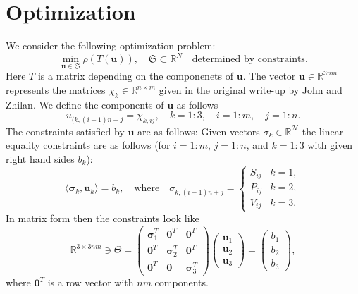 \documentclass[12pt]{amsart}
\theoremstyle{definition}
\begin{document}
\section{Optimization}
We consider the following optimization problem:
\begin{equation}
  \min_{\bm{u}\in \mathfrak{S}} \rho(T(\bm{u})),\quad \mathfrak{S}\subset \mathds{R}^{N} \quad\mbox{determined by constraints}.
\end{equation}
Here $T$ is a matrix depending on the componenets of $\bm{u}$. 
The vector $\bm{u}\in \mathds{R}^{3nm}$ represents the matrices 
$\chi_{k}\in \mathds{R}^{n\times m}$ given in the original write-up by John and Zhilan. We define the components of $\bm u$ as follows
\begin{equation}
  u_{(k,(i-1)n+j}=\chi_{k,ij}, \quad k=1:3, \quad i=1:m,\quad j=1:n.
\end{equation}
The constraints satisfied by $\bm u$ are as follows: Given vectors $\sigma_k\in \mathds{R}^{\mathcal{N}}$ the linear equality constraints are as follows (for $i=1:m$, $j=1:n$, and  $k=1:3$ with given right hand sides $b_k$):
\begin{equation}
\langle \bm{\sigma}_k,\bm{u}_k\rangle = b_k,\quad\mbox{where}\quad
\sigma_{k,(i-1)n+j}=\begin{cases} S_{ij} & k=1,\\
  P_{ij} & k=2,\\
  V_{ij} & k=3.
\end{cases}
\end{equation}
In matrix form then the constraints look like
\begin{equation}\label{def-theta}
  \mathds{R}^{3\times 3nm}\ni \Theta=
    \begin{pmatrix}
      \bm{\sigma}_1^T & \bm{0}^T & \bm{0}^T\\
      \bm{0}^T &  \bm{\sigma}_2^T & \bm{0}^T\\
      \bm{0}^T & \bm{0} & \bm{\sigma}_3^T 
    \end{pmatrix}
    \begin{pmatrix}
      \bm u_1\\ \bm u_2 \\ \bm u_3
    \end{pmatrix}=
    \begin{pmatrix}
      b_1\\ b_2 \\ b_3
    \end{pmatrix},
\end{equation}
where $\bm{0}^T$ is a row vector with $nm$ components.
\end{document}
